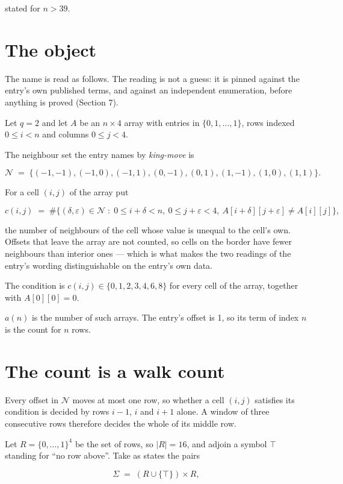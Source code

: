 \documentclass[11pt]{article}
\theoremstyle{definition}
\begin{document}
stated for $n > 39$.

\section{The object}

The name is read as follows. The reading is not a guess: it is pinned against the entry's own published terms, and against an independent enumeration, before anything is proved (Section 7).

Let $q = 2$ and let $A$ be an $n \times 4$ array with entries in $\{0,1,\dots,1\}$, rows indexed $0 \le i < n$ and columns $0 \le j < 4$.

The neighbour set the entry names by {\itshape king-move} is

\[\mathcal{N} \;=\; \{(-1,-1), (-1,0), (-1,1), (0,-1), (0,1), (1,-1), (1,0), (1,1)\}.\]

For a cell $(i,j)$ of the array put

\[c(i,j) \;=\; \#\bigl\{(\delta,\varepsilon)\in\mathcal{N} \;:\; 0\le i+\delta<n,\ 0\le j+\varepsilon<4,\ A[i+\delta][j+\varepsilon] \neq A[i][j]\bigr\},\]

the number of neighbours of the cell whose value is unequal to the cell's own. Offsets that leave the array are not counted, so cells on the border have fewer neighbours than interior ones --- which is what makes the two readings of the entry's wording distinguishable on the entry's own data.

The condition is $c(i,j) \in \{0, 1, 2, 3, 4, 6, 8\}$ for every cell of the array, together with $A[0][0]=0$.

$a(n)$ is the number of such arrays. The entry's offset is 1, so its term of index $n$ is the count for $n$ rows.

\section{The count is a walk count}

Every offset in $\mathcal{N}$ moves at most one row, so whether a cell $(i,j)$ satisfies its condition is decided by rows $i-1$, $i$ and $i+1$ alone. A window of three consecutive rows therefore decides the whole of its middle row.

Let $R = \{0,\dots,1\}^{4}$ be the set of rows, so $|R| = 16$, and adjoin a symbol $\top$ standing for ``no row above''. Take as states the pairs

\[\Sigma \;=\; (R \cup \{\top\}) \times R,\]
\end{document}
